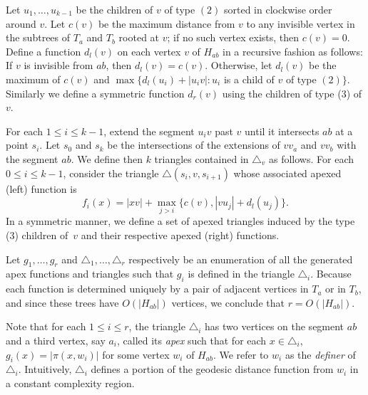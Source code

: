 \documentclass[a4paper,UKenglish]{lipics}
\newcommand{\g}[2]{\ensuremath{|\pi(#1, #2)|}}
\begin{document}
Let $u_1, \ldots, u_{k-1}$ be the children of $v$ of type $(2)$ sorted in clockwise order around $v$.
Let $c(v)$ be the maximum distance from $v$ to any invisible vertex in the subtrees of $T_a$ and $T_b$ rooted at $v$; if no such vertex exists, then $c(v) = 0$. 
Define a function $d_l(v)$ on each vertex $v$ of $H_{ab}$ in a recursive fashion as follows:
If $v$ is invisible from $ab$, then $d_l(v) = c(v)$. 
Otherwise, let $d_l(v)$ be the maximum of $c(v)$ and $\max\{d_l(u_i) + |u_iv| : u_i$ is a child of $v$ of type $(2)\}$.
Similarly we define a symmetric function $d_r(v)$ using the children of type (3) of $v$.

For each $1\leq i\leq k-1$, extend the segment $u_iv$ past $v$ until it intersects $ab$ at a point $s_i$. Let $s_0$ and $s_k$ be the intersections of the extensions of $vv_a$ and $vv_b$ with the segment $ab$.
We define then $k$ triangles contained in $\triangle_v$ as follows. 
For each $0\leq i\leq k-1$, consider the triangle $\triangle(s_i, v, s_{i+1})$ whose associated apexed (left) function is 
$$f_i(x) = |xv| + \max_{j>i}\{c(v), |vu_j| + d_l(u_j)\}.$$
In a symmetric manner, we define a set of apexed triangles induced by the type (3) children of~$v$ and their respective apexed (right) functions.

Let $g_1, \ldots, g_r$ and $\triangle_1, \ldots, \triangle_r$ respectively be an enumeration of all the generated apex functions and triangles such that $g_i$ is defined in the triangle $\triangle_i$. Because each function is determined uniquely by a pair of adjacent vertices in $T_a$ or in $T_b$, and since these trees have $O(|H_{ab}|)$ vertices, we conclude that $r = O(|H_{ab}|)$. 

Note that for each $1\leq i\leq r$, the triangle $\triangle_i$ has two vertices on the segment $ab$ and a third vertex, say $a_i$, called its \emph{apex} such that for each $x\in \triangle_i$, $g_i(x) = \g{x}{w_i}$ for some vertex $w_i$ of $H_{ab}$. We refer to $w_i$ as the \emph{definer} of $\triangle_i$. Intuitively, $\triangle_i$ defines a portion of the geodesic distance function from $w_i$ in a constant complexity region. 
\end{document}
